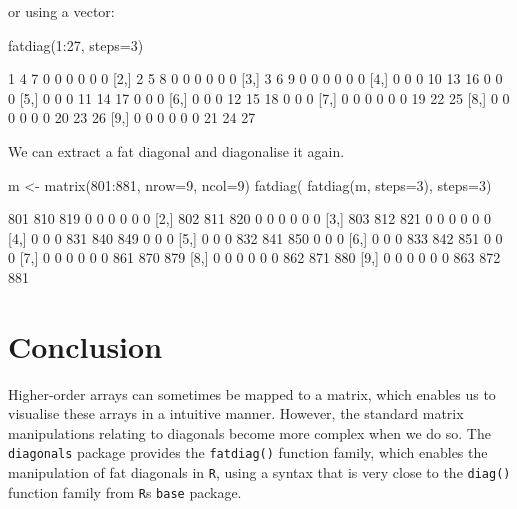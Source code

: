 \documentclass[article]{jss}
\begin{document}
or using a vector:

\begin{CodeChunk}
\begin{CodeInput}
fatdiag(1:27, steps=3)
\end{CodeInput}
\begin{CodeOutput}
      [,1] [,2] [,3] [,4] [,5] [,6] [,7] [,8] [,9]
 [1,]    1    4    7    0    0    0    0    0    0
 [2,]    2    5    8    0    0    0    0    0    0
 [3,]    3    6    9    0    0    0    0    0    0
 [4,]    0    0    0   10   13   16    0    0    0
 [5,]    0    0    0   11   14   17    0    0    0
 [6,]    0    0    0   12   15   18    0    0    0
 [7,]    0    0    0    0    0    0   19   22   25
 [8,]    0    0    0    0    0    0   20   23   26
 [9,]    0    0    0    0    0    0   21   24   27
\end{CodeOutput}
\end{CodeChunk}

We can extract a fat diagonal and diagonalise it again.

\begin{CodeChunk}
\begin{CodeInput}
m <- matrix(801:881, nrow=9, ncol=9)
fatdiag( fatdiag(m, steps=3), steps=3)
\end{CodeInput}
\begin{CodeOutput}
      [,1] [,2] [,3] [,4] [,5] [,6] [,7] [,8] [,9]
 [1,]  801  810  819    0    0    0    0    0    0
 [2,]  802  811  820    0    0    0    0    0    0
 [3,]  803  812  821    0    0    0    0    0    0
 [4,]    0    0    0  831  840  849    0    0    0
 [5,]    0    0    0  832  841  850    0    0    0
 [6,]    0    0    0  833  842  851    0    0    0
 [7,]    0    0    0    0    0    0  861  870  879
 [8,]    0    0    0    0    0    0  862  871  880
 [9,]    0    0    0    0    0    0  863  872  881
\end{CodeOutput}
\end{CodeChunk}

\section{Conclusion}\label{conclusion}

Higher-order arrays can sometimes be mapped to a matrix, which enables
us to visualise these arrays in a intuitive manner. However, the
standard matrix manipulations relating to diagonals become more complex
when we do so. The \texttt{diagonals} package provides the
\texttt{fatdiag()} function family, which enables the manipulation of
fat diagonals in \texttt{R}, using a syntax that is very close to the
\texttt{diag()} function family from \texttt{R}s \texttt{base} package.
\end{document}
